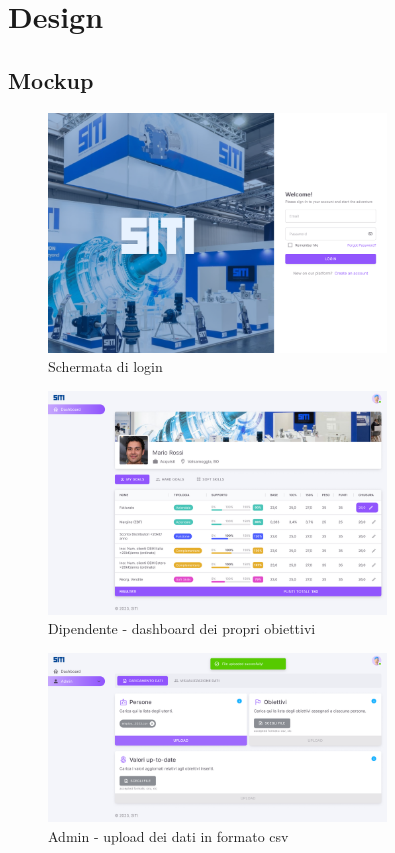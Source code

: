 \section*{Design}

\subsection*{Mockup}

\begin{figure}[h]
    \centering
    \includegraphics[width=0.8\textwidth]{res/login.png}
    \caption{Schermata di login}
    \label{fig:login}
\end{figure}

\begin{figure}[h]
    \centering
    \includegraphics[width=0.8\textwidth]{res/dashboard.png}
    \caption{Dipendente - dashboard dei propri obiettivi}
    \label{fig:dashboard}
\end{figure}

\begin{figure}[h]
    \centering
    \includegraphics[width=0.8\textwidth]{res/upload.png}
    \caption{Admin - upload dei dati in formato csv}
    \label{fig:upload}
\end{figure}

